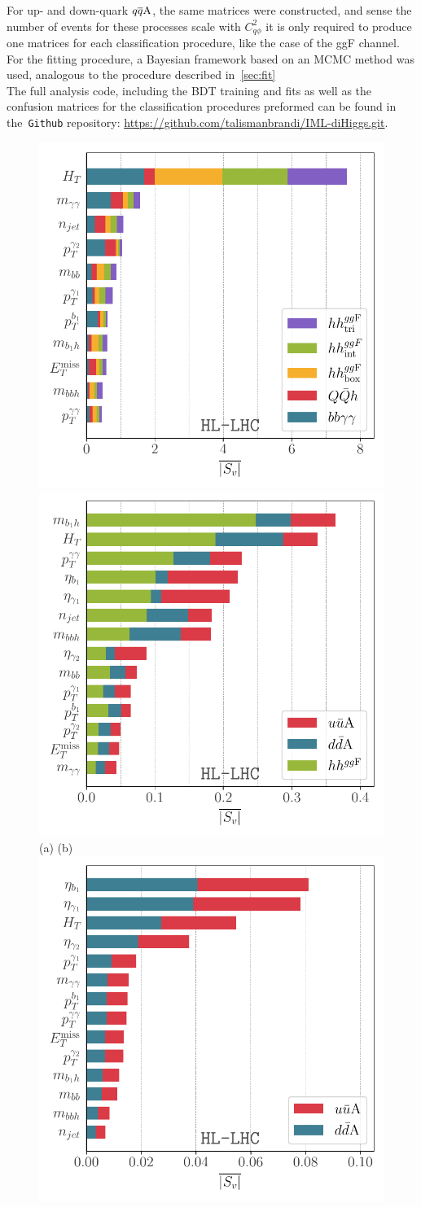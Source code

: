 For up- and down-quark $ q\overline q \rm A$, the same matrices were constructed, and sense the number of events for these processes scale with $C_{q\phi}^2$ it is only required to produce one matrices for each classification procedure, like the case of the ggF channel. For the fitting procedure, a Bayesian framework based on an MCMC method was used, analogous to the procedure described in~\autoref{sec:fit} \\  The full analysis code, including the BDT training and fits as well as the confusion matrices for the classification procedures preformed can be found in the~\texttt{Github} repository: \href{https://github.com/talismanbrandi/IML-diHiggs.git}{https://github.com/talismanbrandi/IML-diHiggs.git}. 
\begin{figure}[t!]
	\centering
	\includegraphics[width=0.4\linewidth]{fig/HL-LHC-shap-bbxaa-bbh-tth-hhsm.pdf}
		\includegraphics[width=0.4\linewidth]{fig/HL-LHC-shap-ku-kd-hhsm.pdf}\\
				  \hspace{.5 cm} 			  { \footnotesize  (a)}    \hspace{5. cm}        { \footnotesize  (b)}  \\
	\includegraphics[width=0.4\linewidth]{fig/HL-LHC-shap-ku-kd.pdf}\\

\end{figure}
